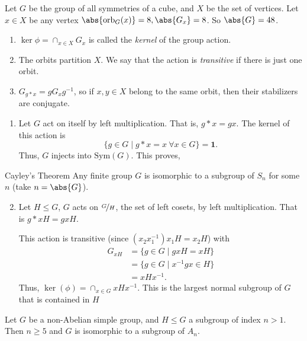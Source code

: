 \begin{example}
    Let \(G\) be the group of all symmetries of a cube, and \(X\) be the set of vertices. Let \(x \in X\) be any vertex \(\abs{\mathrm{orb}_G(x)} = 8, \abs{G_x} =8  \). So \(\abs{G} = 48\).
\end{example}
\begin{remark}
    \begin{enumerate}
        \item \(\ker \phi = \cap_{x\in X} G_x\) is called the \textit{kernel} of the group action.
        \item The orbits partition \(X\). We say that the action is \textit{transitive} if there is just one orbit.
        \item \(G_{g*x} = g G_x g^{-1}\), so if \(x,y \in X\) belong to the same orbit, then their stabilizers are conjugate.
    \end{enumerate}
\end{remark}
\begin{example}
    \leavevmode
    \begin{enumerate}
        \item Let \(G\) act on itself by left multiplication. That is, \(g*x = gx\). The kernel of this action is
    \[
        \{g \in G\mid g*x = x ~\forall x\in G\} = \textbf{1} .
    \]
    Thus, \(G\) injects into \(\mathrm{Sym}(G)\). This proves,
\end{enumerate}
\begin{theorem}{Cayley's Theorem}{}
    Any finite group \(G\) is isomorphic to a subgroup of \(S_n\) for some \(n\) (take \(n = \abs{G} \)).
\end{theorem}
\begin{enumerate}
    \setcounter{enumi}{1}
\item Let \(H \leq G\), \(G\) acts on \(\nicefrac{G}{H}\), the set of left cosets, by left multiplication. That is \(g*xH = gxH\).

This action is transitive (since \((x_{2}x_1^{-1})x_{1}H = x_2 H \)) with
\begin{align*}
    G_{xH} &= \{g\in G \mid gxH = xH\}\\
    &= \{g\in G \mid x^{-1}gx\in H\}\\
    &= xHx^{-1}.
\end{align*}
Thus, \(\ker(\phi) = \cap_{x\in G} xHx^{-1}\). This is the largest normal subgroup of \(G\) that is contained in \(H\)
\end{enumerate}
\end{example}
\begin{theorem}{}{}
    Let \(G\) be a non-Abelian simple group, and \(H\leq G\) a subgroup of index \(n>1\). Then \(n\geq 5\) and \(G\) is isomorphic to a subgroup of \(A_n\).
\end{theorem}

